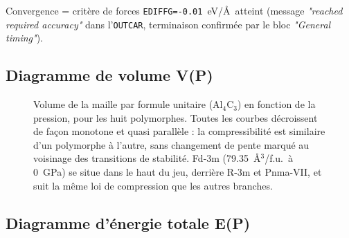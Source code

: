 \documentclass[11pt,a4paper]{article}
\begin{document}
Convergence = critère de forces \texttt{EDIFFG=-0.01}~eV/\AA\ atteint (message \emph{"reached
required accuracy"} dans l'\texttt{OUTCAR}, terminaison confirmée par le bloc \emph{"General
timing"}).

\subsection{Diagramme de volume V(P)}

\begin{figure}[h]
\centering
{}
\caption{Volume de la maille par formule unitaire (Al$_4$C$_3$) en fonction de la pression, pour
les huit polymorphes. Toutes les courbes décroissent de façon monotone et quasi parallèle : la
compressibilité est similaire d'un polymorphe à l'autre, sans changement de pente marqué au
voisinage des transitions de stabilité. Fd-3m (79.35~\AA$^3$/f.u.\ à 0~GPa) se situe dans le
haut du jeu, derrière R-3m et Pnma-VII, et suit la même loi de compression que les autres
branches.}
\label{fig:vp}
\end{figure}

\subsection{Diagramme d'énergie totale E(P)}
\end{document}
